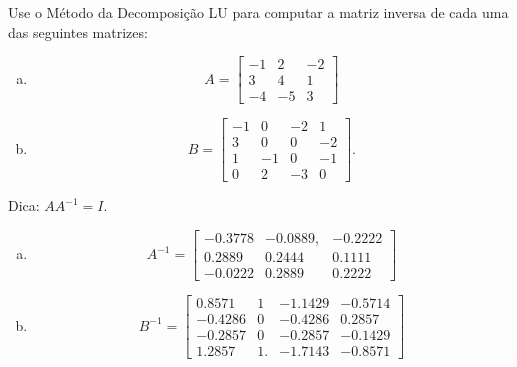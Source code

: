 \begin{exer}
  Use o Método da Decomposição LU para computar a matriz inversa de cada uma das seguintes matrizes:
  \begin{enumerate}[a)]
  \item
  \begin{equation}
    A =
    \begin{bmatrix}
      -1 & 2 & -2\\
      3 & 4 & 1\\
      -4 & -5 & 3
    \end{bmatrix}
  \end{equation}
\item
  \begin{equation}
    B =
    \begin{bmatrix}
      -1 & 0 & -2 & 1\\
      3 & 0 & 0 & -2\\
      1 & -1 & 0 & -1\\
      0 & 2 & -3 & 0
    \end{bmatrix}.
  \end{equation}  
\end{enumerate}
\end{exer}
\begin{resp}
  Dica: $AA^{-1} = I$.
  \begin{enumerate}[a)]
  \item
    \begin{equation}
      A^{-1} =
      \begin{bmatrix}
        -0.3778 & -0.0889, & -0.2222\\
         0.2889 & 0.2444  & 0.1111\\
         -0.0222 & 0.2889 & 0.2222
      \end{bmatrix}
    \end{equation}
  \item
    \begin{equation}
      B^{-1} =
      \begin{bmatrix}
        0.8571  & 1 & -1.1429 & -0.5714\\
        -0.4286 & 0 & -0.4286 & 0.2857\\
        -0.2857 & 0 & -0.2857 & -0.1429\\
        1.2857 &  1. &-1.7143 & -0.8571
      \end{bmatrix}
    \end{equation}
  \end{enumerate}
\end{resp}

